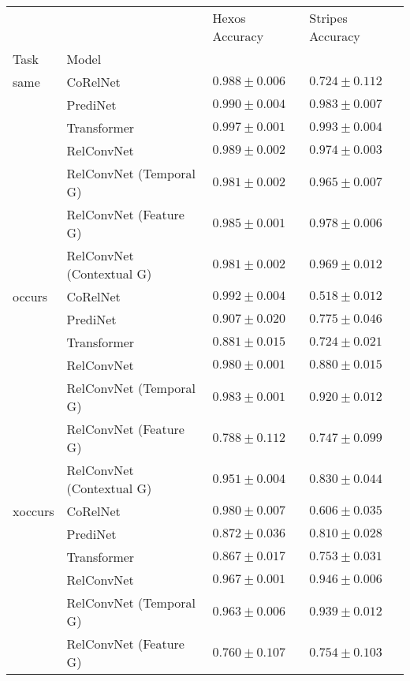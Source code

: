 \begin{tabular}{llll}
\toprule
              &                           &     Hexos Accuracy &   Stripes Accuracy \\
Task & Model &                    &                    \\
\midrule
same & CoRelNet &  $0.988 \pm 0.006$ &  $0.724 \pm 0.112$ \\
              & PrediNet &  $0.990 \pm 0.004$ &  $0.983 \pm 0.007$ \\
              & Transformer &  $0.997 \pm 0.001$ &  $0.993 \pm 0.004$ \\
              & RelConvNet &  $0.989 \pm 0.002$ &  $0.974 \pm 0.003$ \\
              & RelConvNet (Temporal G) &  $0.981 \pm 0.002$ &  $0.965 \pm 0.007$ \\
              & RelConvNet (Feature G) &  $0.985 \pm 0.001$ &  $0.978 \pm 0.006$ \\
              & RelConvNet (Contextual G) &  $0.981 \pm 0.002$ &  $0.969 \pm 0.012$ \\
occurs & CoRelNet &  $0.992 \pm 0.004$ &  $0.518 \pm 0.012$ \\
              & PrediNet &  $0.907 \pm 0.020$ &  $0.775 \pm 0.046$ \\
              & Transformer &  $0.881 \pm 0.015$ &  $0.724 \pm 0.021$ \\
              & RelConvNet &  $0.980 \pm 0.001$ &  $0.880 \pm 0.015$ \\
              & RelConvNet (Temporal G) &  $0.983 \pm 0.001$ &  $0.920 \pm 0.012$ \\
              & RelConvNet (Feature G) &  $0.788 \pm 0.112$ &  $0.747 \pm 0.099$ \\
              & RelConvNet (Contextual G) &  $0.951 \pm 0.004$ &  $0.830 \pm 0.044$ \\
xoccurs & CoRelNet &  $0.980 \pm 0.007$ &  $0.606 \pm 0.035$ \\
              & PrediNet &  $0.872 \pm 0.036$ &  $0.810 \pm 0.028$ \\
              & Transformer &  $0.867 \pm 0.017$ &  $0.753 \pm 0.031$ \\
              & RelConvNet &  $0.967 \pm 0.001$ &  $0.946 \pm 0.006$ \\
              & RelConvNet (Temporal G) &  $0.963 \pm 0.006$ &  $0.939 \pm 0.012$ \\
              & RelConvNet (Feature G) &  $0.760 \pm 0.107$ &  $0.754 \pm 0.103$ \\

\end{tabular}
